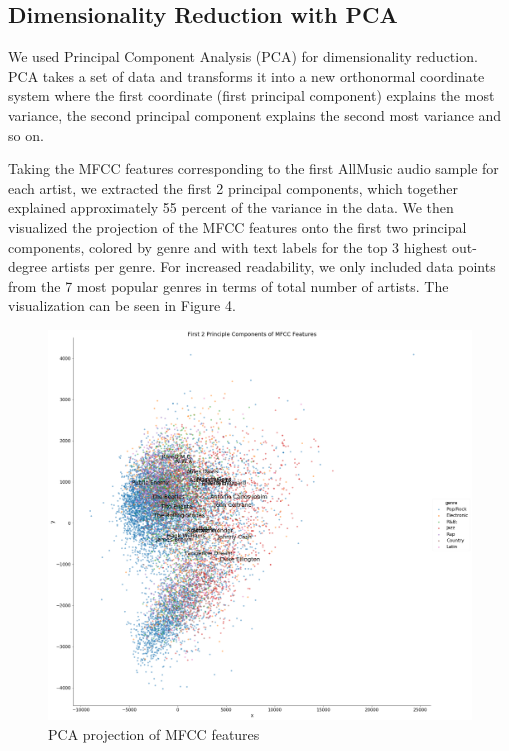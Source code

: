 \subsection{Dimensionality Reduction with PCA}
We used Principal Component Analysis (PCA) for dimensionality reduction. PCA takes a set of data and transforms it into a new orthonormal coordinate system where the first coordinate (first principal component) explains the most variance, the second principal component explains the second most variance and so on.

Taking the MFCC features corresponding to the first AllMusic audio sample for each artist, we extracted the first 2 principal components, which together explained approximately 55 percent of the variance in the data. We then visualized the projection of the MFCC features onto the first two principal components, colored by genre and with text labels for the top 3 highest out-degree artists per genre. For increased readability, we only included data points from the 7 most popular genres in terms of total number of artists. The visualization can be seen in Figure 4.

\newpage
\begin{figure}[H]
\includegraphics[width=15cm]{figures/mfcc_pca.png}
\caption{PCA projection of MFCC features}
\end{figure}

\newpage

